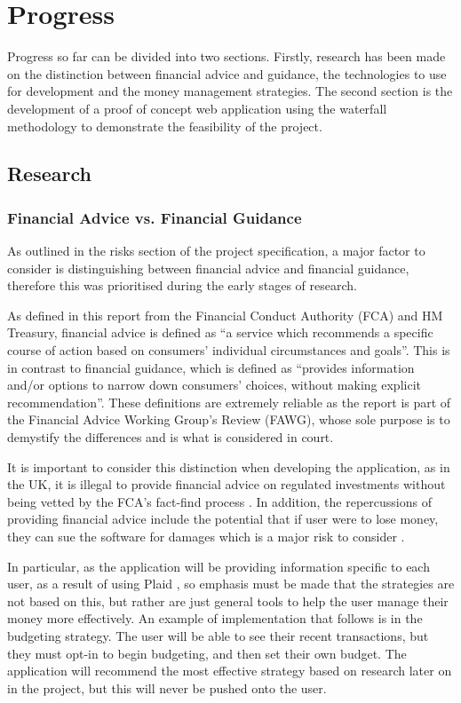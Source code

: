 \section{Progress} \label{sec:progress}

Progress so far can be divided into two sections. Firstly, research has been made on the distinction between financial advice and guidance, the technologies to use for development and the money management strategies. The second section is the development of a proof of concept web application using the waterfall methodology to demonstrate the feasibility of the project.

\subsection{Research}
\subsubsection{Financial Advice vs. Financial Guidance}

As outlined in the risks section of the project specification, a major factor to consider is distinguishing between financial advice and financial guidance, therefore this was prioritised during the early stages of research.

As defined in this report \cite{FCAReport} from the Financial Conduct Authority (FCA) and HM Treasury, financial advice is defined as ``a service which recommends a specific course of action based on consumers' individual circumstances and goals''. This is in contrast to financial guidance, which is defined as ``provides information and/or options to narrow down consumers' choices, without making explicit recommendation''. These definitions are extremely reliable as the report is part of the Financial Advice Working Group's Review (FAWG), whose sole purpose is to demystify the differences and is what is considered in court.

It is important to consider this distinction when developing the application, as in the UK, it is illegal to provide financial advice on regulated investments without being vetted by the FCA's fact-find process \cite{FinancialAdviceLegalities}. In addition, the repercussions of providing financial advice include the potential that if user were to lose money, they can sue the software for damages which is a major risk to consider \cite{SueBroker}. 

In particular, as the application will be providing information specific to each user, as a result of using Plaid \cite{Plaid}, so emphasis must be made that the strategies are not based on this, but rather are just general tools to help the user manage their money more effectively. An example of implementation that follows is in the budgeting strategy. The user will be able to see their recent transactions, but they must opt-in to begin budgeting, and then set their own budget. The application will recommend the most effective strategy based on research later on in the project, but this will never be pushed onto the user.